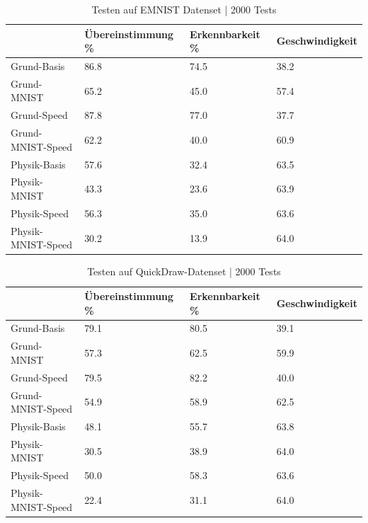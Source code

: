 \begin{table}[!ht]
    \centering
    \caption{Testen auf EMNIST Datenset | 2000 Tests}\label{tab:EMNIST}
    \begin{tabular}{|l|l|l|l|}
    \hline
        ~ & Übereinstimmung \% & Erkennbarkeit \% & Geschwindigkeit \\ \hline
        Grund-Basis & 86.8 & 74.5 & 38.2 \\ \hline
        Grund-MNIST & 65.2 & 45.0 & 57.4 \\ \hline
        Grund-Speed & 87.8 & 77.0 & 37.7 \\ \hline
        Grund-MNIST-Speed & 62.2 & 40.0 & 60.9 \\ \hline
        Physik-Basis & 57.6 & 32.4 & 63.5 \\ \hline
        Physik-MNIST & 43.3 & 23.6 & 63.9 \\ \hline
        Physik-Speed & 56.3 & 35.0 & 63.6 \\ \hline
        Physik-MNIST-Speed & 30.2 & 13.9 & 64.0 \\ \hline
    \end{tabular}
\end{table}

\begin{table}[!ht]
    \centering
    \caption{Testen auf QuickDraw-Datenset | 2000 Tests}\label{tab:Quickdraw}
    \begin{tabular}{|l|l|l|l|}
    \hline
        ~ & Übereinstimmung \% & Erkennbarkeit \% & Geschwindigkeit \\ \hline
        Grund-Basis & 79.1 & 80.5 & 39.1 \\ \hline
        Grund-MNIST & 57.3 & 62.5 & 59.9 \\ \hline
        Grund-Speed & 79.5 & 82.2 & 40.0 \\ \hline
        Grund-MNIST-Speed & 54.9 & 58.9 & 62.5 \\ \hline
        Physik-Basis & 48.1 & 55.7 & 63.8 \\ \hline
        Physik-MNIST & 30.5 & 38.9 & 64.0 \\ \hline
        Physik-Speed & 50.0 & 58.3 & 63.6 \\ \hline
        Physik-MNIST-Speed & 22.4 & 31.1 & 64.0 \\ \hline
    \end{tabular}
\end{table}

\newpage

